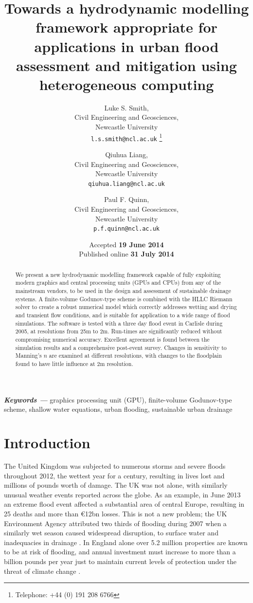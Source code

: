 \documentclass[11pt,english,a4paper]{article}
\title{Towards a hydrodynamic modelling framework appropriate for applications in urban flood assessment and mitigation using heterogeneous computing}
\author{Luke S. Smith,\\
	Civil Engineering and Geosciences,\\
	Newcastle University\\
	\texttt{l.s.smith@ncl.ac.uk}
	\thanks{Telephone: +44 (0) 191 208 6766}
\and
	Qiuhua Liang,\\
	Civil Engineering and Geosciences,\\
	Newcastle University\\
	\texttt{qiuhua.liang@ncl.ac.uk}
\and
	Paul F. Quinn,\\
	Civil Engineering and Geosciences,\\
	Newcastle University\\
	\texttt{p.f.quinn@ncl.ac.uk}
}
\date{\vspace*{12.0pt}Accepted \textbf{19 June 2014} \\ Published online \textbf{31 July 2014}}
\providecommand{\keywords}[1]{\textbf{\textit{Keywords ---}} #1}
\begin{document}
\maketitle

\begin{abstract}
We present a new hydrodynamic modelling framework capable of fully exploiting modern graphics and central processing units (GPUs and CPUs) from any of the mainstream vendors, to be used in the design and assessment of sustainable drainage systems. A finite-volume Godunov-type scheme is combined with the HLLC Riemann solver to create a robust numerical model which correctly addresses wetting and drying and transient flow conditions, and is suitable for application to a wide range of flood simulations. The software is tested with a three day flood event in Carlisle during 2005, at resolutions from 25m to 2m. Run-times are significantly reduced without compromising numerical accuracy. Excellent agreement is found between the simulation results and a comprehensive post-event survey. Changes in sensitivity to Manning's \(n\) are examined at different resolutions, with changes to the floodplain found to have little influence at 2m resolution.
\end{abstract}
\keywords{graphics processing unit (GPU), finite-volume Godunov-type scheme, shallow water equations, urban flooding, sustainable urban drainage}

\vfill
\noindent{}

\section{Introduction}

The United Kingdom was subjected to numerous storms and severe floods throughout 2012, the wettest year for a century, resulting in lives lost and millions of pounds worth of damage. The UK was not alone, with similarly unusual weather events reported across the globe. As an example, in June 2013 an extreme flood event affected a substantial area of central Europe, resulting in 25 deaths and more than \euro{12bn} losses. This is not a new problem; the UK Environment Agency attributed two thirds of flooding during 2007 when a similarly wet season caused widespread disruption, to surface water and inadequacies in drainage \citep{Pitt2007}. In England alone over 5.2 million properties are known to be at risk of flooding, and annual investment must increase to more than a billion pounds per year just to maintain current levels of protection under the threat of climate change \citep{EnvironmentAgency2009a}. 
\end{document}
